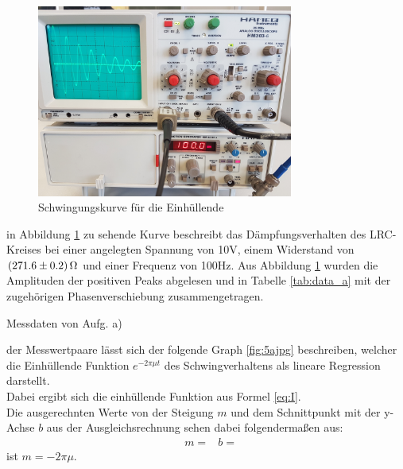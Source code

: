   \begin{figure}[H]
    \includegraphics[width=0.75\textwidth]{images/5a.jpg}
    \centering
    \caption{Schwingungskurve für die Einhüllende}
    \label{fig:5a}
  \end{figure}
  \newpage

  \justifying in Abbildung \ref{fig:5a} zu sehende Kurve beschreibt das Dämpfungsverhalten des LRC-Kreises bei einer angelegten Spannung von 
  10V, einem Widerstand von $\SI{271.6\pm0.2}{\ohm}$ und einer Frequenz von 100Hz. Aus Abbildung \ref{fig:5a} wurden die Amplituden der positiven Peaks
  abgelesen und in Tabelle \ref{tab:data_a} mit der zugehörigen Phasenverschiebung zusammengetragen.

  \begin{table}[H]
        \centering
        \caption{Messdaten von Aufg. a)}
         
        \label{tab:data_a}
  \end{table}

  \justifying der Messwertpaare lässt sich der folgende Graph \ref{fig:5ajpg} beschreiben, welcher die Einhüllende 
  Funktion $e^{-2\pi\mu t}$ des Schwingverhaltens als lineare Regression darstellt.\\
  Dabei ergibt sich die einhüllende Funktion aus Formel \eqref{eq:I}.\\
  Die ausgerechnten Werte von der Steigung $m$ und dem Schnittpunkt mit der y-Achse $b$ aus der Ausgleichsrechnung sehen dabei folgendermaßen aus:
  \begin{align}
      &m=\text{}
      &b=\text{}
  \end{align}
  \justifying ist $m=-2\pi \mu$.

